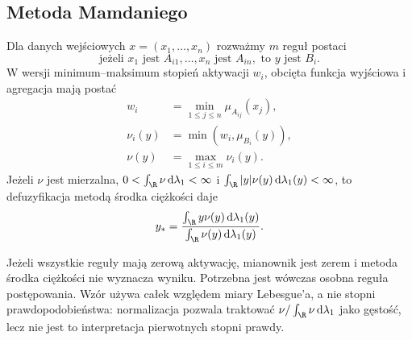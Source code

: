 \subsection{Metoda Mamdaniego}
\begin{definicja}\label{def:lst-fuzzy-mamdani}
Dla danych wejściowych $x=(x_1,\ldots,x_n)$ rozważmy
$m$ reguł postaci
\[
 \text{jeżeli }x_1\text{ jest }A_{i1},\ldots,
 x_n\text{ jest }A_{in},\text{ to }y\text{ jest }B_i.
\]
W wersji minimum--maksimum stopień aktywacji $w_i$,
obcięta funkcja wyjściowa i agregacja mają postać
\[
\begin{split}
 w_i&=\min_{1\leq j\leq n}\mu_{A_{ij}}(x_j),\\
 \nu_i(y)&=\min(w_i,\mu_{B_i}(y)),\\
 \nu(y)&=\max_{1\leq i\leq m}\nu_i(y).
\end{split}
\]
Jeżeli $\nu$ jest mierzalna,
$0<\int_\R\nu\,\mathrm d\lambda_1<\infty$ i
$\int_\R |y|\nu(y)\,\mathrm d\lambda_1(y)<\infty$, to
defuzyfikacja metodą środka ciężkości daje
\[
 y_*=\frac{\int_\R y\nu(y)\,\mathrm d\lambda_1(y)}
 {\int_\R\nu(y)\,\mathrm d\lambda_1(y)}.
\]
\end{definicja}
Jeżeli wszystkie reguły mają zerową aktywację, mianownik
jest zerem i metoda środka ciężkości nie wyznacza wyniku.
Potrzebna jest wówczas osobna reguła postępowania.
Wzór używa całek względem miary Lebesgue'a, a nie stopni
prawdopodobieństwa: normalizacja pozwala traktować
$\nu/\int_\R\nu\,\mathrm d\lambda_1$ jako gęstość,
lecz nie jest to interpretacja pierwotnych stopni prawdy.

